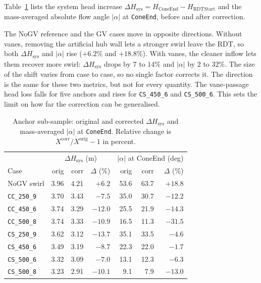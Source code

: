 Table~\ref{tab:correctRDT-anchor} lists the system head increase $\Delta H_\mathrm{sys} = H_\mathrm{ConeEnd} - H_\mathrm{RDTStart}$ and the mass-averaged absolute flow angle $|\alpha|$ at \texttt{ConeEnd}, before and after correction.

The NoGV reference and the GV cases move in opposite directions. Without vanes, removing the artificial hub wall lets a stronger swirl leave the RDT, so both $\Delta H_\mathrm{sys}$ and $|\alpha|$ rise ($+6.2\%$ and $+18.8\%$). With vanes, the cleaner inflow lets them recover more swirl: $\Delta H_\mathrm{sys}$ drops by $7$ to $14\%$ and $|\alpha|$ by $2$ to $32\%$. The size of the shift varies from case to case, so no single factor corrects it. The direction is the same for these two metrics, but not for every quantity. The vane-passage head loss falls for five anchors and rises for \texttt{CS\_450\_6} and \texttt{CS\_500\_6}. This sets the limit on how far the correction can be generalised.

\begin{table}[H]
\centering
\small
\caption[Anchor sub-sample: head and angle]{Anchor sub-sample: original and corrected $\Delta H_\mathrm{sys}$ and mass-averaged $|\alpha|$ at \texttt{ConeEnd}. Relative change is $X^\mathrm{corr}/X^\mathrm{orig} - 1$ in percent.}
\label{tab:correctRDT-anchor}
\begin{tabular}{l rrr rrr}
\hline
     & \multicolumn{3}{c}{$\Delta H_\mathrm{sys}$ (m)} & \multicolumn{3}{c}{$|\alpha|$ at ConeEnd (deg)} \\
Case & orig & corr & $\Delta$ (\%) & orig & corr & $\Delta$ (\%) \\ \hline
NoGV swirl          & 3.96 & 4.21 & $+6.2$   & 53.6 & 63.7 & $+18.8$ \\
\texttt{CC\_250\_9} & 3.70 & 3.43 & $-7.5$   & 35.0 & 30.7 & $-12.2$ \\
\texttt{CC\_450\_6} & 3.74 & 3.29 & $-12.0$  & 25.5 & 21.9 & $-14.3$ \\
\texttt{CC\_500\_8} & 3.74 & 3.33 & $-10.9$  & 16.5 & 11.3 & $-31.5$ \\
\texttt{CS\_250\_9} & 3.62 & 3.12 & $-13.7$  & 35.1 & 33.5 & $-4.6$  \\
\texttt{CS\_450\_6} & 3.49 & 3.19 & $-8.7$   & 22.3 & 22.0 & $-1.7$  \\
\texttt{CS\_500\_6} & 3.32 & 3.09 & $-7.0$   & 13.1 & 12.3 & $-6.3$  \\
\texttt{CS\_500\_8} & 3.23 & 2.91 & $-10.1$  &  9.1 &  7.9 & $-13.0$ \\ \hline
\end{tabular}
\end{table}

